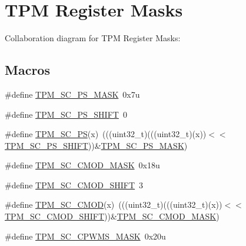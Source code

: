 \hypertarget{group___t_p_m___register___masks}{}\section{T\+PM Register Masks}
\label{group___t_p_m___register___masks}
Collaboration diagram for T\+PM Register Masks\+:
\subsection*{Macros}
\begin{DoxyCompactItemize}
\item 
\#define \hyperlink{group___t_p_m___register___masks_gab20218cf8b49b4d2aa932cfafdf5a43e}{T\+P\+M\+\_\+\+S\+C\+\_\+\+P\+S\+\_\+\+M\+A\+SK}~0x7u
\item 
\#define \hyperlink{group___t_p_m___register___masks_ga13fca37c98cc93640be8ed1733cb9805}{T\+P\+M\+\_\+\+S\+C\+\_\+\+P\+S\+\_\+\+S\+H\+I\+FT}~0
\item 
\#define \hyperlink{group___t_p_m___register___masks_ga41fa7e0f125e9bdeaf17b70dea969399}{T\+P\+M\+\_\+\+S\+C\+\_\+\+PS}(x)~(((uint32\+\_\+t)(((uint32\+\_\+t)(x))$<$$<$\hyperlink{group___t_p_m___register___masks_ga13fca37c98cc93640be8ed1733cb9805}{T\+P\+M\+\_\+\+S\+C\+\_\+\+P\+S\+\_\+\+S\+H\+I\+FT}))\&\hyperlink{group___t_p_m___register___masks_gab20218cf8b49b4d2aa932cfafdf5a43e}{T\+P\+M\+\_\+\+S\+C\+\_\+\+P\+S\+\_\+\+M\+A\+SK})
\item 
\#define \hyperlink{group___t_p_m___register___masks_ga86346adaa1aec83adbcf3a21289d6400}{T\+P\+M\+\_\+\+S\+C\+\_\+\+C\+M\+O\+D\+\_\+\+M\+A\+SK}~0x18u
\item 
\#define \hyperlink{group___t_p_m___register___masks_ga9268286302a41feb004444a7b368af69}{T\+P\+M\+\_\+\+S\+C\+\_\+\+C\+M\+O\+D\+\_\+\+S\+H\+I\+FT}~3
\item 
\#define \hyperlink{group___t_p_m___register___masks_gae0978f8437371339fe391bf34ff321bb}{T\+P\+M\+\_\+\+S\+C\+\_\+\+C\+M\+OD}(x)~(((uint32\+\_\+t)(((uint32\+\_\+t)(x))$<$$<$\hyperlink{group___t_p_m___register___masks_ga9268286302a41feb004444a7b368af69}{T\+P\+M\+\_\+\+S\+C\+\_\+\+C\+M\+O\+D\+\_\+\+S\+H\+I\+FT}))\&\hyperlink{group___t_p_m___register___masks_ga86346adaa1aec83adbcf3a21289d6400}{T\+P\+M\+\_\+\+S\+C\+\_\+\+C\+M\+O\+D\+\_\+\+M\+A\+SK})
\item 
\#define \hyperlink{group___t_p_m___register___masks_ga2ed4f55ed6ec313d2f5c0cef0d9606e7}{T\+P\+M\+\_\+\+S\+C\+\_\+\+C\+P\+W\+M\+S\+\_\+\+M\+A\+SK}~0x20u
\item 

\end{DoxyCompactItemize}
